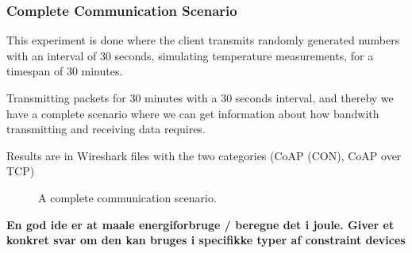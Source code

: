 \subsubsection{Complete Communication Scenario}
This experiment is done where the client transmits randomly generated numbers with an interval of 30 seconds, simulating temperature measurements, for a timespan of 30 minutes.

Transmitting packets for 30 minutes with a 30 seconds interval, and thereby we have a complete scenario where we can get information about how bandwith transmitting and receiving data requires.

Results are in Wireshark files with the two categories (CoAP (CON), CoAP over TCP)
\begin{figure}[!t]
	\caption{A complete communication scenario.}
	\label{fig:completescenario}
\end{figure}


\textbf{En god ide er at maale energiforbruge / beregne det i joule. Giver et konkret svar om den kan bruges i specifikke typer af constraint devices}


